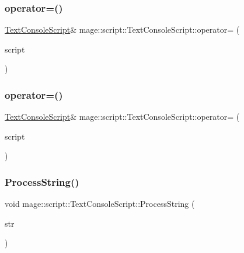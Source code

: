 \subsubsection{\texorpdfstring{operator=()}{operator=()}\hspace{0.1cm}{\footnotesize\ttfamily [1/2]}}
{\footnotesize\ttfamily \hyperlink{classmage_1_1script_1_1_text_console_script}{Text\+Console\+Script}\& mage\+::script\+::\+Text\+Console\+Script\+::operator= (\begin{DoxyParamCaption}\item[{const \hyperlink{classmage_1_1script_1_1_text_console_script}{Text\+Console\+Script} \&}]{script }\end{DoxyParamCaption})\hspace{0.3cm}{\ttfamily [delete]}}

\hypertarget{classmage_1_1script_1_1_text_console_script_ae8560dece8d507ee338dda68e3176fed}{}\label{classmage_1_1script_1_1_text_console_script_ae8560dece8d507ee338dda68e3176fed} 
\subsubsection{\texorpdfstring{operator=()}{operator=()}\hspace{0.1cm}{\footnotesize\ttfamily [2/2]}}
{\footnotesize\ttfamily \hyperlink{classmage_1_1script_1_1_text_console_script}{Text\+Console\+Script}\& mage\+::script\+::\+Text\+Console\+Script\+::operator= (\begin{DoxyParamCaption}\item[{\hyperlink{classmage_1_1script_1_1_text_console_script}{Text\+Console\+Script} \&\&}]{script }\end{DoxyParamCaption})\hspace{0.3cm}{\ttfamily [delete]}}

\hypertarget{classmage_1_1script_1_1_text_console_script_a29334fd8aa8de09b2f28c24096347498}{}\label{classmage_1_1script_1_1_text_console_script_a29334fd8aa8de09b2f28c24096347498} 
\subsubsection{\texorpdfstring{Process\+String()}{ProcessString()}}
{\footnotesize\ttfamily void mage\+::script\+::\+Text\+Console\+Script\+::\+Process\+String (\begin{DoxyParamCaption}\item[{const wchar\+\_\+t $\ast$}]{str }\end{DoxyParamCaption})\hspace{0.3cm}{\ttfamily [private]}}

